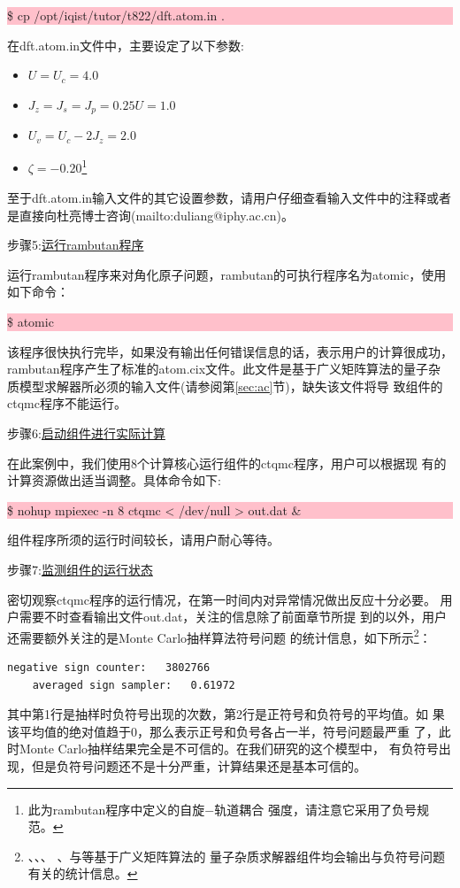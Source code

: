 \noindent\colorbox{pink}{\parbox[r]{\linewidth}{\quad \$ cp /opt/iqist/tutor/t822/dft.atom.in . }}

在dft.atom.in文件中，主要设定了以下参数:

\begin{itemize}
\item $U = U_{c} = 4.0$
\item $J_{z} = J_{s} = J_{p} = 0.25U = 1.0$
\item $U_{v} = U_{c} - 2J_{z} = 2.0$
\item $\zeta=-0.20$\footnote{此为rambutan程序中定义的自旋$-$轨道耦合
      强度，请注意它采用了负号规范。}
\end{itemize}
至于dft.atom.in输入文件的其它设置参数，请用户仔细查看输入文件中的注释或者
是直接向杜亮博士咨询(mailto:duliang@iphy.ac.cn)。

步骤5:\underline{运行rambutan程序}

运行rambutan程序来对角化原子问题，rambutan的可执行程序名为atomic，使用
如下命令：

\noindent\colorbox{pink}{\parbox[r]{\linewidth}{\quad \$ atomic }}

该程序很快执行完毕，如果没有输出任何错误信息的话，表示用户的计算很成功，
rambutan程序产生了标准的atom.cix文件。此文件是基于广义矩阵算法的量子杂
质模型求解器所必须的输入文件(请参阅第\ref{sec:ac}节)，缺失该文件将导
致{\lavender}组件的ctqmc程序不能运行。

步骤6:\underline{启动{\lavender}组件进行实际计算}

在此案例中，我们使用8个计算核心运行{\lavender}组件的ctqmc程序，用户可以根据现
有的计算资源做出适当调整。具体命令如下:

\noindent\colorbox{pink}{\parbox[r]{\linewidth}{\quad \$ nohup mpiexec -n 8 ctqmc < /dev/null >  out.dat \&}}
{\lavender}组件程序所须的运行时间较长，请用户耐心等待。

步骤7:\underline{监测{\lavender}组件的运行状态}

密切观察ctqmc程序的运行情况，在第一时间内对异常情况做出反应十分必要。
用户需要不时查看输出文件out.dat，关注的信息除了前面章节所提
到的以外，用户还需要额外关注的是Monte Carlo抽样算法符号问题
的统计信息，如下所示\footnote{{\begonia}、{\lavender}、{\camellia}、
{\epiphyllum}、{\pansy}与{\manjushaka}等基于广义矩阵算法的
量子杂质求解器组件均会输出与负符号问题有关的统计信息。}：
\begin{lstlisting}[frame=single]
    negative sign counter:   3802766
    averaged sign sampler:   0.61972
\end{lstlisting}
其中第1行是抽样时负符号出现的次数，第2行是正符号和负符号的平均值。如
果该平均值的绝对值趋于0，那么表示正号和负号各占一半，符号问题最严重
了，此时Monte Carlo抽样结果完全是不可信的。在我们研究的这个模型中，
有负符号出现，但是负符号问题还不是十分严重，计算结果还是基本可信的。

